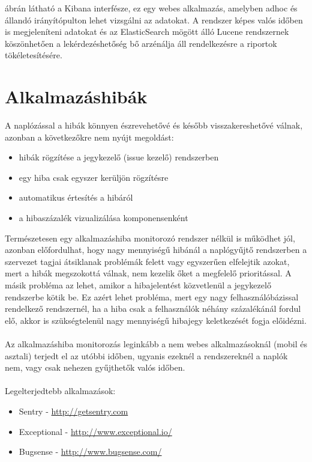  ábrán látható a Kibana interfésze, ez egy webes alkalmazás, amelyben adhoc és állandó irányítópulton lehet vizsgálni az adatokat. A rendszer képes valós időben is megjeleníteni adatokat és az ElasticSearch mögött álló Lucene rendszernek köszönhetően a lekérdezéshetőség bő arzénálja áll rendelkezésre a riportok tökéletesítésére.

\section{Alkalmazáshibák}
A naplózással a hibák könnyen észrevehetővé és később visszakereshetővé válnak, azonban a következőkre nem nyújt megoldást:\\
\begin{itemize}
\item hibák rögzítése a jegykezelő (issue kezelő) rendszerben
\item egy hiba csak egyszer kerüljön rögzítésre
\item automatikus értesítés a hibáról
\item a hibaszázalék vizualizálása komponensenként
\end{itemize}

Természetesen egy alkalmazáshiba monitorozó rendszer nélkül is működhet jól, azonban előfordulhat, hogy nagy mennyiségű hibánál a naplógyűjtő rendszerben a szervezet tagjai átsiklanak problémák felett vagy egyszerűen elfelejtik azokat, mert a hibák megszokottá válnak, nem kezelik őket a megfelelő prioritással. A másik probléma az lehet, amikor a hibajelentést közvetlenül a jegykezelő rendszerbe kötik be. Ez azért lehet probléma, mert egy nagy felhasználóbázissal rendelkező rendszernél, ha a hiba csak a felhasználók néhány százalékánál fordul elő, akkor is szükségtelenül nagy mennyiségű hibajegy keletkezését fogja előidézni.\\
\hfill\\
Az alkalmazáshiba monitorozás leginkább a nem webes alkalmazásoknál (mobil és asztali) terjedt el az utóbbi időben, ugyanis ezeknél a rendszereknél a naplók nem, vagy csak nehezen gyűjthetők valós időben.\\
\hfill\\
Legelterjedtebb alkalmazások:
\begin{itemize}
\item Sentry - \url{http://getsentry.com}
\item Exceptional - \url{http://www.exceptional.io/}
\item Bugsense - \url{http://www.bugsense.com/}
\end{itemize}

